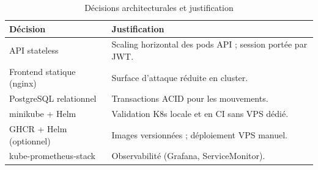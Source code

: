 \begin{table}[htbp]
  \centering
  \caption{Décisions architecturales et justification}
  \label{tab:decisions-archi}
  \begin{tabularx}{\textwidth}{@{}lX@{}}
    \toprule
    \textbf{Décision} & \textbf{Justification} \\
    \midrule
    API stateless & Scaling horizontal des pods API ; session portée par JWT. \\
    Frontend statique (nginx) & Surface d'attaque réduite en cluster. \\
    PostgreSQL relationnel & Transactions ACID pour les mouvements. \\
    minikube + Helm & Validation K8s locale et en CI sans VPS dédié. \\
    GHCR + Helm (optionnel) & Images versionnées ; déploiement VPS manuel. \\
    kube-prometheus-stack & Observabilité (Grafana, ServiceMonitor). \\
    \bottomrule
  \end{tabularx}
\end{table}
